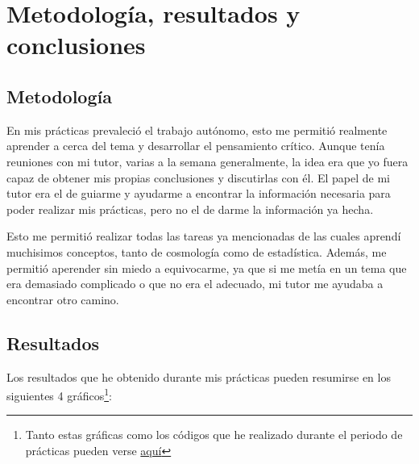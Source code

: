 \documentclass[12pt, a4paper]{article}
\theoremstyle{definition}
\begin{document}
\section{Metodología, resultados y conclusiones}
\subsection{Metodología}

En mis prácticas prevaleció el trabajo autónomo, esto me permitió realmente aprender a cerca del tema y desarrollar el pensamiento crítico. Aunque tenía reuniones con mi tutor, varias a la semana generalmente, la idea era que yo fuera capaz de obtener mis propias conclusiones y discutirlas con él. El papel de mi tutor era el de guiarme y ayudarme a encontrar la información necesaria para poder realizar mis prácticas, pero no el de darme la información ya hecha.

Esto me permitió realizar todas las tareas ya mencionadas de las cuales aprendí muchisimos conceptos, tanto de cosmología como de estadística. Además, me permitió aperender sin miedo a equivocarme, ya que si me metía en un tema que era demasiado complicado o que no era el adecuado, mi tutor me ayudaba a encontrar otro camino.
\subsection{Resultados}

Los resultados que he obtenido durante mis prácticas pueden resumirse en los siguientes 4 gráficos\footnote{Tanto estas gráficas como los códigos que he realizado durante el periodo de prácticas pueden verse \href{https://github.com/PhyAMR/Internship}{aquí}}:
\end{document}
